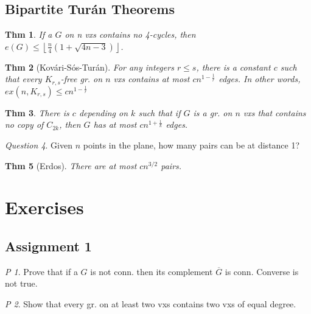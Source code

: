 \documentclass[11pt, fleqn, a4paper, landscape]{article}
\theoremstyle{plain} %
\newtheorem{thm}{Thm}
\theoremstyle{remark} %
\newtheorem{que}[thm]{Question}
\newtheorem{problem}{P}
\theoremstyle{definition} %
\begin{document}
\begin{multicols}{5}
\subsection{Bipartite Turán Theorems}

\begin{thm}
If a $G$ on n vxs contains no 4-cycles, then $e(G)\le\left\lfloor\frac{n}{4}(1+\sqrt{4n-3})\right\rfloor$.
\end{thm}
\addtocounter{thm}{1}
\begin{thm}[Kovári-Sós-Turán]
For any integers $r \le s$, there is a constant $c$ such that every
$K_{r,s}$-free gr. on $n$ vxs contains at most $cn^{1-\frac{1}{r}}$ edges. In other words, $ex(n,K_{r,s}) \le cn^{1-\frac{1}{r}}$ 
\end{thm}

\begin{thm}
There is $c$ depending on $k$ such that if $G$ is a gr. on $n$ vxs that contains no copy of $C_{2k}$, then $G$ has at most $cn^{1+\frac{1}{k}}$ edges.
\end{thm}

\begin{que}
Given $n$ points in the plane, how many pairs can be at distance 1?
\end{que}

\begin{thm}[Erdos]
There are at most $cn^{3/2}$ pairs.
\end{thm}

\section{Exercises}
\subsection{Assignment 1}


\addtocounter{problem}{1}

\addtocounter{problem}{1}

\begin{problem}
Prove that if a $G$ is not conn. then its complement $\overline{G}$ is conn. Converse is not true.
\end{problem}

\begin{problem}
Show that every gr. on at least two vxs contains two vxs of equal
degree.
\end{problem}


\end{multicols}
\end{document}

